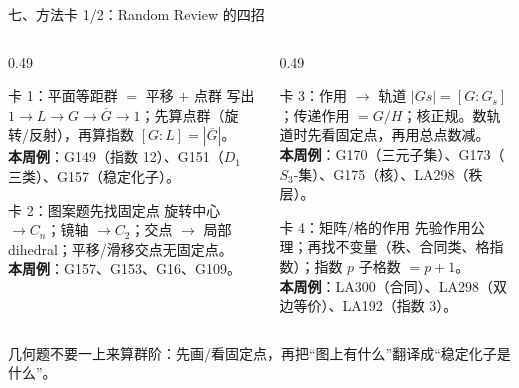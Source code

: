 \documentclass[aspectratio=169,10pt,fontset=none]{ctexbeamer}
\newcommand{\key}[1]{\textcolor{ink}{\bfseries #1}}
\begin{document}
\begin{frame}[t]{七、方法卡 1/2：Random Review 的四招}
  \label{sec:methods}
  \begin{columns}[T,onlytextwidth]
    \begin{column}{0.49\textwidth}
      \begin{block}{\footnotesize 卡 1：平面等距群 $=$ 平移 $+$ 点群}
        \scriptsize
        写出 $1\to L\to G\to\overline G\to1$；先算点群（旋转/反射），再算指数 $[G:L]=|\overline G|$。\\
        \key{本周例}：G149（指数 12）、G151（$D_1$ 三类）、G157（稳定化子）。
      \end{block}
      \begin{block}{\footnotesize 卡 2：图案题先找固定点}
        \scriptsize
        旋转中心 $\to C_n$；镜轴 $\to C_2$；交点 $\to$ 局部 dihedral；平移/滑移交点无固定点。\\
        \key{本周例}：G157、G153、G16、G109。
      \end{block}
    \end{column}
    \begin{column}{0.49\textwidth}
      \begin{block}{\footnotesize 卡 3：作用 $\to$ 轨道}
        \scriptsize
        $|Gs|=[G:G_s]$；传递作用 $=G/H$；核正规。数轨道时先看固定点，再用总点数减。\\
        \key{本周例}：G170（三元子集）、G173（$S_3$-集）、G175（核）、LA298（秩层）。
      \end{block}
      \begin{block}{\footnotesize 卡 4：矩阵/格的作用}
        \scriptsize
        先验作用公理；再找不变量（秩、合同类、格指数）；指数 $p$ 子格数 $=p+1$。\\
        \key{本周例}：LA300（合同）、LA298（双边等价）、LA192（指数 3）。
      \end{block}
    \end{column}
  \end{columns}
  \vspace{0.2em}
  {\scriptsize\color{ink!70} 几何题不要一上来算群阶：先画/看固定点，再把“图上有什么”翻译成“稳定化子是什么”。}
\end{frame}
\end{document}
